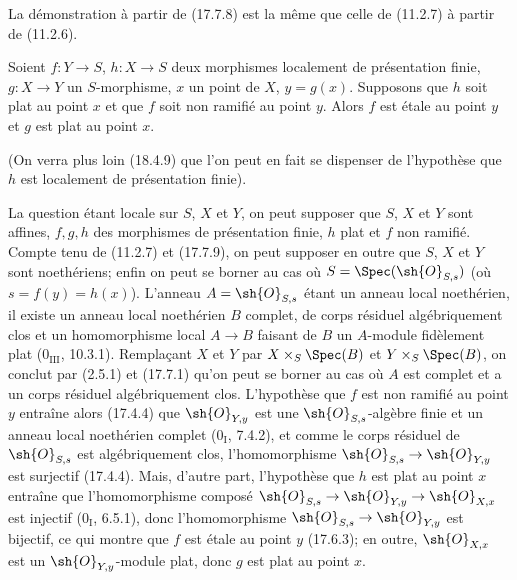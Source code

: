 La démonstration à partir de (17.7.8) est la même que celle de (11.2.7) à partir de (11.2.6).

\begin{proposition}[17.7.10]
\label{IV.17.7.10}
Soient $f:Y\to S$, $h:X\to S$ deux morphismes localement de présentation finie, $g:X\to Y$ un $S$-morphisme, $x$ un point de $X$, $y=g(x)$. Supposons que $h$ soit plat au point $x$ et que $f$ soit non ramifié au point $y$. Alors $f$ est étale au point $y$ et $g$ est plat au point $x$.
\end{proposition}

(On verra plus loin (18.4.9) que l'on peut en fait se dispenser de l'hypothèse que $h$ est localement de présentation finie).

La question étant locale sur $S$, $X$ et $Y$, on peut supposer que $S$, $X$ et $Y$ sont affines, $f,g,h$ des morphismes de présentation finie, $h$ plat et $f$ non ramifié. Compte tenu de (11.2.7) et (17.7.9), on peut supposer en outre que $S$, $X$ et $Y$ sont noethériens; enfin on peut se borner au cas où $S=\Spec(\sh{O}_{S,s})$ (où $s=f(y)=h(x)$). L'anneau $A=\sh{O}_{S,s}$ étant un anneau local noethérien, il existe un anneau local noethérien $B$ complet, de corps résiduel algébriquement clos et un homomorphisme local $A\to B$ faisant de $B$ un $A$-module fidèlement plat ($0_{\mathrm{III}}$, 10.3.1). Remplaçant $X$ et $Y$ par $X\times_S\Spec(B)$ et $Y\times_S\Spec(B)$, on conclut par (2.5.1) et (17.7.1) qu'on peut se borner au cas où $A$ est complet et a un corps résiduel algébriquement clos. L'hypothèse que $f$ est non ramifié au point $y$ entraîne alors (17.4.4) que $\sh{O}_{Y,y}$ est une $\sh{O}_{S,s}$-algèbre finie et un anneau local noethérien complet ($0_{\mathrm I}$, 7.4.2), et comme le corps résiduel de $\sh{O}_{S,s}$ est algébriquement clos, l'homomorphisme $\sh{O}_{S,s}\to\sh{O}_{Y,y}$ est surjectif (17.4.4). Mais, d'autre part, l'hypothèse que $h$ est plat au point $x$ entraîne que l'homomorphisme composé $\sh{O}_{S,s}\to\sh{O}_{Y,y}\to\sh{O}_{X,x}$ est injectif ($0_{\mathrm I}$, 6.5.1), donc l'homomorphisme $\sh{O}_{S,s}\to\sh{O}_{Y,y}$ est bijectif, ce qui montre que $f$ est étale au point $y$ (17.6.3); en outre, $\sh{O}_{X,x}$ est un $\sh{O}_{Y,y}$-module plat, donc $g$ est plat au point $x$.

